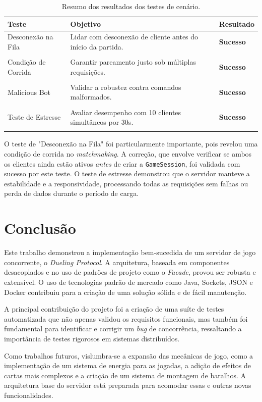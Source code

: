 \documentclass[corpo=12pt,a4paper]{sbc-artigos}
\begin{document}
\begin{table}[h]
\centering
\caption{Resumo dos resultados dos testes de cenário.}
\label{tab:resultados}
\begin{tabular}{@{}lp{4.5cm}l@{}}
\toprule
Teste & Objetivo & Resultado \\ \midrule
Desconexão na Fila & Lidar com desconexão de cliente antes do início da partida. & \textbf{Sucesso} \\ \\
Condição de Corrida & Garantir pareamento justo sob múltiplas requisições. & \textbf{Sucesso} \\ \\
Malicious Bot & Validar a robustez contra comandos malformados. & \textbf{Sucesso} \\ \\
Teste de Estresse & Avaliar desempenho com 10 clientes simultâneos por 30s. & \textbf{Sucesso} \\ \\
\bottomrule
\end{tabular}
\end{table}

O teste de "Desconexão na Fila" foi particularmente importante, pois revelou uma condição de corrida no \textit{matchmaking}. A correção, que envolve verificar se ambos os clientes ainda estão ativos \textit{antes} de criar a \texttt{GameSession}, foi validada com sucesso por este teste. O teste de estresse demonstrou que o servidor manteve a estabilidade e a responsividade, processando todas as requisições sem falhas ou perda de dados durante o período de carga.

\section{Conclusão}

Este trabalho demonstrou a implementação bem-sucedida de um servidor de jogo concorrente, o \textit{Dueling Protocol}. A arquitetura, baseada em componentes desacoplados e no uso de padrões de projeto como o \textit{Facade}, provou ser robusta e extensível. O uso de tecnologias padrão de mercado como Java, Sockets, JSON e Docker contribuiu para a criação de uma solução sólida e de fácil manutenção.

A principal contribuição do projeto foi a criação de uma suíte de testes automatizada que não apenas validou os requisitos funcionais, mas também foi fundamental para identificar e corrigir um \textit{bug} de concorrência, ressaltando a importância de testes rigorosos em sistemas distribuídos.

Como trabalhos futuros, vislumbra-se a expansão das mecânicas de jogo, como a implementação de um sistema de energia para as jogadas, a adição de efeitos de cartas mais complexos e a criação de um sistema de montagem de baralhos. A arquitetura base do servidor está preparada para acomodar essas e outras novas funcionalidades.



\end{document}
